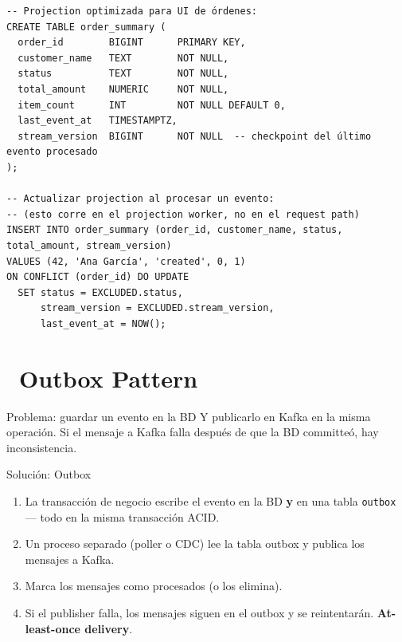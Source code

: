 \begin{lstlisting}[caption={Tabla de proyección (read model)}]
-- Projection optimizada para UI de órdenes:
CREATE TABLE order_summary (
  order_id        BIGINT      PRIMARY KEY,
  customer_name   TEXT        NOT NULL,
  status          TEXT        NOT NULL,
  total_amount    NUMERIC     NOT NULL,
  item_count      INT         NOT NULL DEFAULT 0,
  last_event_at   TIMESTAMPTZ,
  stream_version  BIGINT      NOT NULL  -- checkpoint del último evento procesado
);

-- Actualizar projection al procesar un evento:
-- (esto corre en el projection worker, no en el request path)
INSERT INTO order_summary (order_id, customer_name, status, total_amount, stream_version)
VALUES (42, 'Ana García', 'created', 0, 1)
ON CONFLICT (order_id) DO UPDATE
  SET status = EXCLUDED.status,
      stream_version = EXCLUDED.stream_version,
      last_event_at = NOW();
\end{lstlisting}

\section[Outbox Pattern]{~Outbox Pattern}

Problema: guardar un evento en la BD Y publicarlo en Kafka en la misma operación. Si el mensaje a Kafka falla después de que la BD committeó, hay inconsistencia.

\begin{teoriabox}{Solución: Outbox}
\begin{enumerate}
  \item La transacción de negocio escribe el evento en la BD \textbf{y} en una tabla \texttt{outbox} — todo en la misma transacción ACID.
  \item Un proceso separado (poller o CDC) lee la tabla outbox y publica los mensajes a Kafka.
  \item Marca los mensajes como procesados (o los elimina).
  \item Si el publisher falla, los mensajes siguen en el outbox y se reintentarán. \textbf{At-least-once delivery}.
\end{enumerate}
\end{teoriabox}

